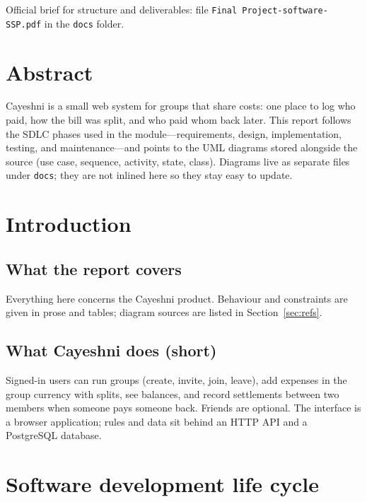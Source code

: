 \documentclass[11pt,a4paper]{article}
\begin{document}
\vspace{0.75em}
\noindent Official brief for structure and deliverables: file \texttt{Final Project-software- SSP.pdf} in the \texttt{docs} folder.

\section{Abstract}

Cayeshni is a small web system for groups that share costs: one place to log who paid, how the bill was split, and who paid whom back later. This report follows the SDLC phases used in the module---requirements, design, implementation, testing, and maintenance---and points to the UML diagrams stored alongside the source (use case, sequence, activity, state, class). Diagrams live as separate files under \texttt{docs}; they are not inlined here so they stay easy to update.

\section{Introduction}

\subsection{What the report covers}

Everything here concerns the Cayeshni product. Behaviour and constraints are given in prose and tables; diagram sources are listed in Section~\ref{sec:refs}.

\subsection{What Cayeshni does (short)}

Signed-in users can run groups (create, invite, join, leave), add expenses in the group currency with splits, see balances, and record settlements between two members when someone pays someone back. Friends are optional. The interface is a browser application; rules and data sit behind an HTTP API and a PostgreSQL database.

\section{Software development life cycle}
\end{document}
